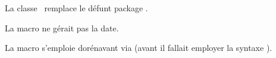 \begin{tdocbreak}
	\item La classe \thisproj\ remplace le défunt package  \thisproj.
\end{tdocbreak}


\begin{tdocfix}
	\item La macro  ne gérait pas la date.

	\item La macro  s'emploie dorénavant via  (avant il fallait employer la syntaxe ).
\end{tdocfix}
